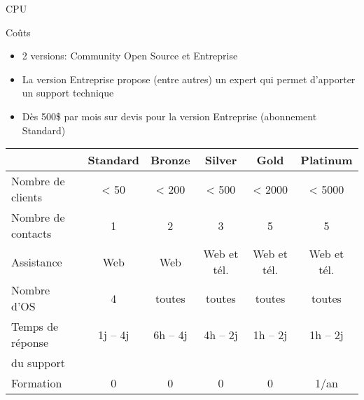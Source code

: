 \documentclass[aspectratio=169]{beamer}
\begin{document}
\begin{frame}{CPU}
\end{frame}

\begin{frame}{Coûts}
\begin{center}

\begin{itemize}
    \item 2 versions: Community Open Source et Entreprise
    \item La version Entreprise propose (entre autres) un expert qui permet d'apporter un support technique
    \item Dès 500\$ par mois sur devis pour la version Entreprise (abonnement Standard)
\end{itemize}

 \begin{tabular}{|l|ccccc|}
    \hline
    & Standard & Bronze & Silver & Gold & Platinum \\
    \hline
    \hline
    Nombre de clients & < 50 & < 200 & < 500 & < 2000 & < 5000 \\
    \hline
    Nombre de contacts & 1 & 2 & 3 & 5 & 5 \\
    \hline
    Assistance & Web & Web & Web et tél.& Web et tél. & Web et tél. \\
    \hline
    Nombre d'OS & 4 & toutes & toutes & toutes & toutes \\
    \hline
    Temps de réponse & 1j -- 4j & 6h -- 4j & 4h -- 2j & 1h -- 2j & 1h -- 2j \\ %
    du support &  & & & & \\
    \hline
    Formation & 0 & 0 & 0 & 0 & 1/an \\
    \hline
 \end{tabular}
\end{center}
\end{frame}
\end{document}
